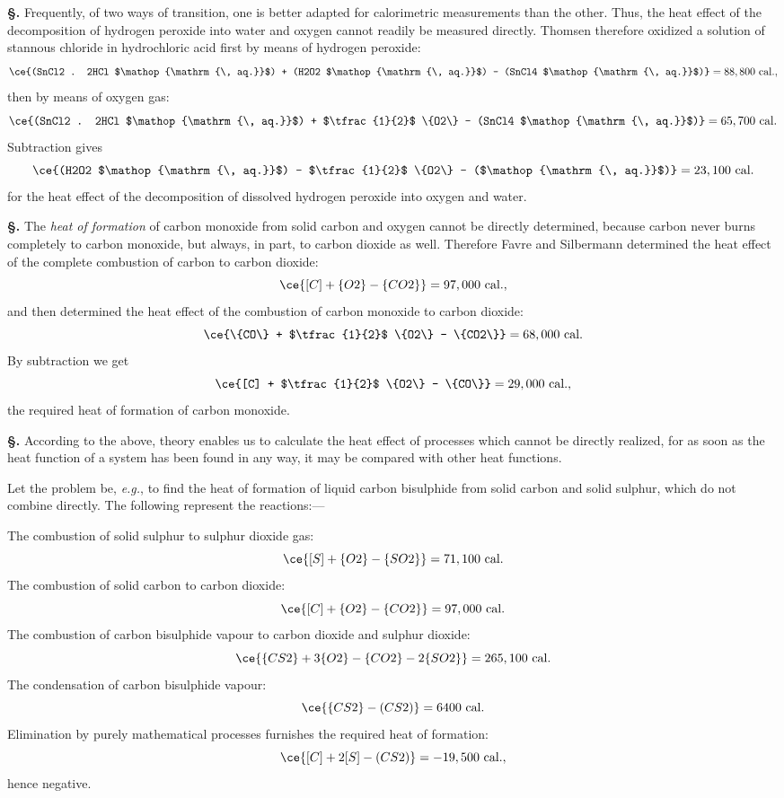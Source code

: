 \documentclass[12pt]{book}[2005/09/16]
\newcommand{\Section}[1]{
  \medskip\par\textbf{§\;#1}
  \label{section:#1}
}
\newcommand{\PageSep}[1]{\ignorespaces}
\newcommand{\eg}{\emph{e.g.}}
\DeclareMathOperator{\aq}{\, aq.}
\newcommand{\Unit}[1]{\text{\upshape #1}}
\begin{document}
\Section{102.} Frequently, of two ways of transition, one is
better adapted for calorimetric measurements than the
other. Thus, the heat effect of the decomposition of
hydrogen peroxide into water and oxygen cannot readily
be measured directly. Thomsen therefore oxidized a solution
\PageSep{74}
of stannous chloride in hydrochloric acid first by means of
hydrogen peroxide:
%
\[
\ce{(SnCl2 . 2HCl $\aq$) + (H2O2 $\aq$) - (SnCl4 $\aq$)} = 88,800~\Unit{cal.},
\]
then by means of oxygen gas:
\[
\ce{(SnCl2 . 2HCl $\aq$) + $\tfrac{1}{2}$ \{O2\} - (SnCl4 $\aq$)} = 65,700~\Unit{cal.}
\]
Subtraction gives
\[
\ce{(H2O2 $\aq$) - $\tfrac{1}{2}$ \{O2\} - ($\aq$)} = 23,100~\Unit{cal.}
\]
for the heat effect of the decomposition of dissolved hydrogen
peroxide into oxygen and water.

\Section{103.} The \emph{heat of formation} of carbon monoxide from
%
%
solid carbon and oxygen cannot be directly determined,
because carbon never burns completely to carbon monoxide,
but always, in part, to carbon dioxide as well. Therefore
Favre and Silbermann determined the heat effect of the
%
%
complete combustion of carbon to carbon dioxide:
\[
\ce{[C] + \{O2\} - \{CO2\}} = 97,000~\Unit{cal.},
\]
and then determined the heat effect of the combustion of
carbon monoxide to carbon dioxide:
\[
\ce{\{CO\} + $\tfrac{1}{2}$ \{O2\} - \{CO2\}} = 68,000~\Unit{cal.}
\]
By subtraction we get
\[
\ce{[C] + $\tfrac{1}{2}$ \{O2\} - \{CO\}} = 29,000~\Unit{cal.},
\]
the required heat of formation of carbon monoxide.

\Section{104.} According to the above, theory enables us to
calculate the heat effect of processes which cannot be
directly realized, for as soon as the heat function of a
system has been found in any way, it may be compared
with other heat functions.

Let the problem be, \eg, to find the heat of formation
of liquid carbon bisulphide from solid carbon and solid
sulphur, which do not combine directly. The following
represent the reactions:---
\PageSep{75}

The combustion of solid sulphur to sulphur dioxide gas:
\[
\ce{[S] + \{O2\} - \{SO2\}} = 71,100~\Unit{cal.}
\]
The combustion of solid carbon to carbon dioxide:
\[
\ce{[C] + \{O2\} - \{CO2\}} = 97,000~\Unit{cal.}
\]
The combustion of carbon bisulphide vapour to carbon
dioxide and sulphur dioxide:
\[
\ce{\{CS2\} + 3\{O2\} - \{CO2\} - 2\{SO2\}} = 265,100~\Unit{cal.}
\]
The condensation of carbon bisulphide vapour:
\[
\ce{\{CS2\} - (CS2)} = 6400~\Unit{cal.}
\]
Elimination by purely mathematical processes furnishes the
required heat of formation:
%
%
\[
\ce{[C] + 2[S] - (CS2)} = - 19,500~\Unit{cal.},
\]
hence negative.
\end{document}

